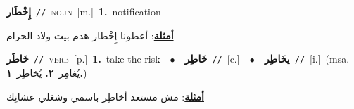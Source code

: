 \documentclass[10pt,a4paper,twoside]{article} %
\begin{document}
\begin{multicols}{2}
{\setlength\topsep{0pt}\textbf{\foreignlanguage{arabic}{إِخْطَار}}\ {\color{gray}\texttt{//}\color{black}}\ \textsc{noun}\ [m.]\ \textbf{1.}~notification\  \begin{flushright}\color{gray}\foreignlanguage{arabic}{\textbf{\underline{\foreignlanguage{arabic}{أمثلة}}}: أعطونا إِخْطار هدم بيت ولاد الحرام}\end{flushright}\color{black}} \vspace{2mm}

{\setlength\topsep{0pt}\textbf{\foreignlanguage{arabic}{خَاطَر}}\ {\color{gray}\texttt{//}\color{black}}\ \textsc{verb}\ [p.]\ \textbf{1.}~take the risk\ \ $\bullet$\ \ \setlength\topsep{0pt}\textbf{\foreignlanguage{arabic}{خَاطِر}}\ {\color{gray}\texttt{//}\color{black}}\ [c.]\ \ $\bullet$\ \ \setlength\topsep{0pt}\textbf{\foreignlanguage{arabic}{يخَاطِر}}\ {\color{gray}\texttt{//}\color{black}}\ [i.]\ \color{gray}(msa. \foreignlanguage{arabic}{يُغامِر}~\foreignlanguage{arabic}{\textbf{٢.}}  \foreignlanguage{arabic}{يُخاطِر}~\foreignlanguage{arabic}{\textbf{١.}})\color{black}\  \begin{flushright}\color{gray}\foreignlanguage{arabic}{\textbf{\underline{\foreignlanguage{arabic}{أمثلة}}}: مش مستعد أخاطِر باسمي وشغلي عشانِك}\end{flushright}\color{black}} \vspace{2mm}


\end{multicols}
\end{document}
